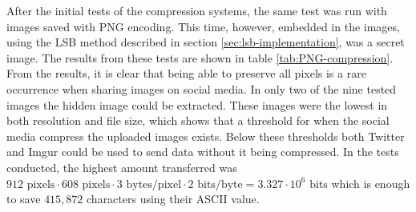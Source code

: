 After the initial tests of the compression systems, the same test was run with images saved with PNG encoding.
This time, however, embedded in the images, using the LSB method described in section \ref{sec:lsb-implementation}, was a secret image.
The results from these tests are shown in table \ref{tab:PNG-compression}.
From the results, it is clear that being able to preserve all pixels is a rare occurrence when sharing images on social media.
In only two of the nine tested images the hidden image could be extracted.
These images were the lowest in both resolution and file size, which shows that a threshold for when the social media compress the uploaded images exists.
Below these thresholds both Twitter and Imgur could be used to send data without it being compressed.
In the tests conducted, the highest amount transferred was $912\text{ pixels} \cdot 608\text{ pixels} \cdot 3\text{ bytes/pixel} \cdot 2\text{ bits/byte} = 3.327\cdot 10^6\text{ bits}$ which is enough to save $415,872$ characters using their ASCII value.

